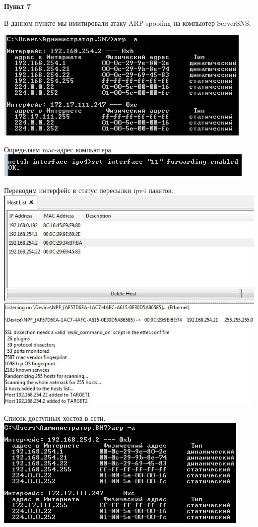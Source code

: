\documentclass[a4paper,14pt]{extarticle}
\begin{document}
    \textbf{Пункт 7}
    \vspace{-3ex}
    \begin{center}
        \singlespacing
        В данном пункте мы имитировали атаку ARP-spoofing на компьютер ServerSNS.

        \includegraphics[scale=0.8]{pics/7_1.jpg}
        
        Определяем mac-адрес компьютера.
        \includegraphics[scale=0.8]{pics/7_2.jpg}

        Переводим интерфейс в статус пересылки ipv4 пакетов.
        \includegraphics[scale=0.64]{pics/7_3.jpg}

        Список доступных хостов в сети.
        \includegraphics[scale=0.8]{pics/7_4.jpg}


\end{center}
\end{document}
